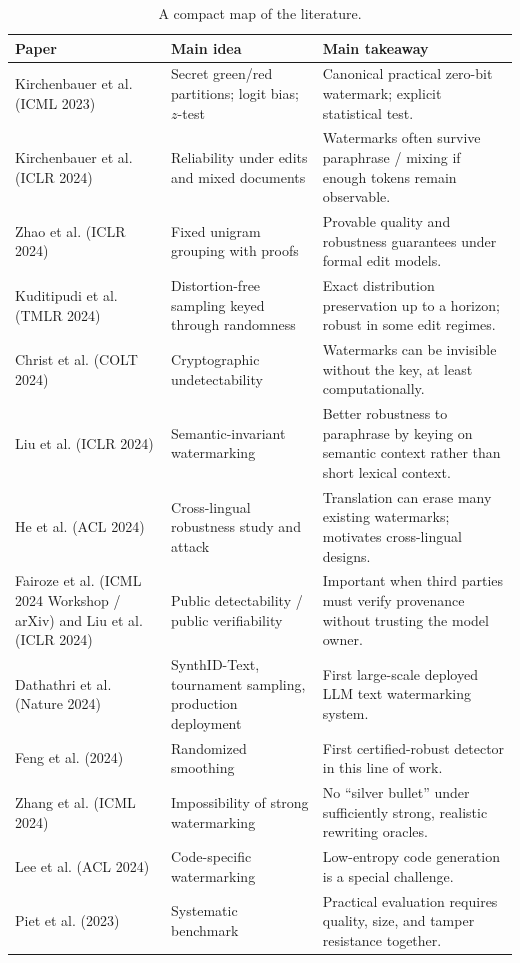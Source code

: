 \documentclass[11pt]{article}
\theoremstyle{definition}
\newcommand{\1}{\mathbf{1}}
\begin{document}
\begin{table}[H]
\centering
\small
\begin{tabularx}{\textwidth}{@{}>{\raggedright\arraybackslash}p{2.9cm} >{\raggedright\arraybackslash}p{2.6cm} X@{}}
\toprule
Paper & Main idea & Main takeaway \\
\midrule
Kirchenbauer et al. (ICML 2023) \cite{kirchenbauer2023watermark} & Secret green/red partitions; logit bias; $z$-test & Canonical practical zero-bit watermark; explicit statistical test. \\
Kirchenbauer et al. (ICLR 2024) \cite{kirchenbauer2024reliability} & Reliability under edits and mixed documents & Watermarks often survive paraphrase / mixing if enough tokens remain observable. \\
Zhao et al. (ICLR 2024) \cite{zhao2024provable} & Fixed unigram grouping with proofs & Provable quality and robustness guarantees under formal edit models. \\
Kuditipudi et al. (TMLR 2024) \cite{kuditipudi2024distortionfree} & Distortion-free sampling keyed through randomness & Exact distribution preservation up to a horizon; robust in some edit regimes. \\
Christ et al. (COLT 2024) \cite{christ2024undetectable} & Cryptographic undetectability & Watermarks can be invisible without the key, at least computationally. \\
Liu et al. (ICLR 2024) \cite{liu2024sir} & Semantic-invariant watermarking & Better robustness to paraphrase by keying on semantic context rather than short lexical context. \\
He et al. (ACL 2024) \cite{he2024translation} & Cross-lingual robustness study and attack & Translation can erase many existing watermarks; motivates cross-lingual designs. \\
Fairoze et al. (ICML 2024 Workshop / arXiv) \cite{fairoze2024public} and Liu et al. (ICLR 2024) \cite{liu2024upv} & Public detectability / public verifiability & Important when third parties must verify provenance without trusting the model owner. \\
Dathathri et al. (Nature 2024) \cite{dathathri2024synthid} & SynthID-Text, tournament sampling, production deployment & First large-scale deployed LLM text watermarking system. \\
Feng et al. (2024) \cite{feng2024certified} & Randomized smoothing & First certified-robust detector in this line of work. \\
Zhang et al. (ICML 2024) \cite{zhang2024watermarkssand} & Impossibility of strong watermarking & No ``silver bullet'' under sufficiently strong, realistic rewriting oracles. \\
Lee et al. (ACL 2024) \cite{lee2024code} & Code-specific watermarking & Low-entropy code generation is a special challenge. \\
Piet et al. (2023) \cite{piet2023markmywords} & Systematic benchmark & Practical evaluation requires quality, size, and tamper resistance together. \\
\bottomrule
\end{tabularx}
\caption{A compact map of the literature.}
\label{tab:literature}
\end{table}
\end{document}

